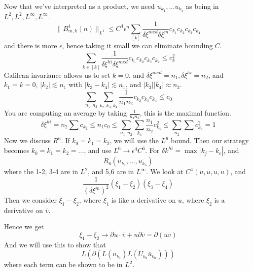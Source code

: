 Now that we've interpreted as a product, we need $u_{k_1}, ... u_{k_4}$ as being in $L^2, L^2, L^\infty, L^\infty$. 
\begin{equation*}
    \|B_{m,k}^4(n)\|_{L^1}\leq C^4\epsilon^n \sum_{[k]}\frac{1}{\delta\xi^{med}\delta\xi^m}c_{k_1}c_{k_2}c_{k_3}c_{k_4}
\end{equation*}
and there is more $\epsilon$, hence taking it small we can eliminate bounding $C$.
\begin{equation*}
    \sum_{k\in[k]}\frac{1}{\delta\xi^{hi}\delta\xi^{med}}c_{k_1}c_{k_2}c_{k_3}c_{k_4}\leq c_k^2
\end{equation*}
Galilean invariance allows us to set $k=0$, and $\delta\xi^{med}=n_1, \delta\xi^{hi}=n_2$, and $k_1=k=0$, $|k_2|\lesssim n_1$ with $|k_3-k_4|\lesssim n_1$, and $|k_3||k_4|\approx n_2$.
\begin{equation*}
    \sum_{n_1, n_2}\sum_{k_2, k_3, k_4}\frac{1}{n_1n_2}c_{k_2}c_{k_3}c_{k_4}\leq c_0
\end{equation*}
You are computing an average by taking $\frac{1}{n_1n_2}$, this is the maximal function.
\begin{equation*}
    \delta\xi^{hi}=n_2\sum c_{k_2}\leq n_1c_0\leq\sum_{n_1, n_2}\sum_{k_4}\frac{n_1}{n_2}c_{k_4}^2\leq\sum_{n_2}\sum c_{k_4}^2=1
\end{equation*}
Now we discuss $R^6$. If $k_0=k_1=k_2$, we will use the $L^6$ bound. Then our strategy becomes $k_0=k_1=k_2=...$, and use $L^6\to \epsilon^4C^6$. For $\delta k^{hi}=\max|k_j-k_e|$,  and 
\begin{equation*}
    R_6(u_{k_1}, ..., \overline{u_{k_6}})
\end{equation*}
where the 1-2, 3-4 are in $L^2$, and 5,6 are in $L^\infty$. We look at $C^4(u, \overline{u}, u, \overline{u})$, and 
\begin{equation*}
    \frac{1}{(\delta\xi^m)^2}(\xi_1-\xi_2)(\xi_3-\xi_4)
\end{equation*}
Then we consider $\xi_1-\xi_2$, where $\xi_1$ is like a derivative on $u$, where $\xi_2$ is a derivative on $\overline{v}$.

Hence we get 
\begin{equation*}
    \xi_1-\xi_2\to\partial u\cdot\overline{v}+u\partial\overline{v}=\partial(u\overline{v})
\end{equation*}
And we will use this to show that 
\begin{equation*}
    L(\partial(L(u_{k_1})L(U_{k_3}\overline{u}_{k_n})))
\end{equation*}
where each term can be shown to be in $L^2$.

